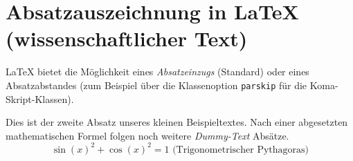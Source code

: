 \documentclass[a4paper
,parskip
]{scrartcl}
\begin{document}
%
\section*{Absatzauszeichnung in \LaTeX{} (wissenschaftlicher Text)}
%
\LaTeX{} bietet die Möglichkeit eines \emph{Absatzeinzugs} (Standard) oder eines Absatzabstandes (zum Beispiel über die Klassenoption \texttt{parskip} für die Koma-Skript-Klassen).

Dies ist der zweite Absatz unseres kleinen Beispieltextes. Nach einer abgesetzten mathematischen Formel folgen noch weitere \emph{Dummy-Text} Absätze.
%
\[
\sin(x)^2 + \cos(x)^2 = 1 \text{ (Trigonometrischer Pythagoras)}
\]

\blindtext

\blindenumerate

\blindtext
\end{document}
